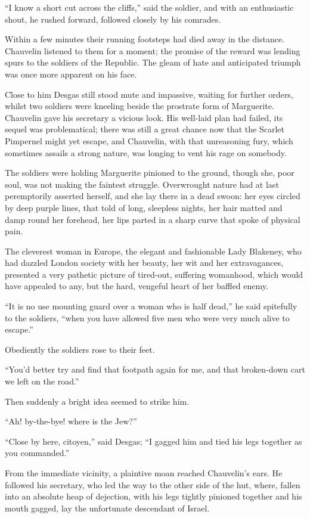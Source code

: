 \enquote{I know a short cut across the cliffs,} said the soldier, and with an enthusiastic shout, he rushed forward, followed closely by his comrades.

Within a few minutes their running footsteps had died away in the distance. Chauvelin listened to them for a moment; the promise of the reward was lending spurs to the soldiers of the Republic. The gleam of hate and anticipated triumph was once more apparent on his face.

Close to him Desgas still stood mute and impassive, waiting for further orders, whilst two soldiers were kneeling beside the prostrate form of Marguerite. Chauvelin gave his secretary a vicious look. His well-laid plan had failed, its sequel was problematical; there was still a great chance now that the Scarlet Pimpernel might yet escape, and Chauvelin, with that unreasoning fury, which sometimes assails a strong nature, was longing to vent his rage on somebody.

The soldiers were holding Marguerite pinioned to the ground, though she, poor soul, was not making the faintest struggle. Overwrought nature had at last peremptorily asserted herself, and she lay there in a dead swoon: her eyes circled by deep purple lines, that told of long, sleepless nights, her hair matted and damp round her forehead, her lips parted in a sharp curve that spoke of physical pain.

The cleverest woman in Europe, the elegant and fashionable Lady Blakeney, who had dazzled London society with her beauty, her wit and her extravagances, presented a very pathetic picture of tired-out, suffering womanhood, which would have appealed to any, but the hard, vengeful heart of her baffled enemy.

\enquote{It is no use mounting guard over a woman who is half dead,} he said spitefully to the soldiers, \enquote{when you have allowed five men who were very much alive to escape.}

Obediently the soldiers rose to their feet.

\enquote{You'd better try and find that footpath again for me, and that broken-down cart we left on the road.}

Then suddenly a bright idea seemed to strike him.

\enquote{Ah! by-the-bye! where is the Jew?}

\enquote{Close by here, citoyen,} said Desgas; \enquote{I gagged him and tied his legs together as you commanded.}

From the immediate vicinity, a plaintive moan reached Chauvelin's ears. He followed his secretary, who led the way to the other side of the hut, where, fallen into an absolute heap of dejection, with his legs tightly pinioned together and his mouth gagged, lay the unfortunate descendant of Israel.

